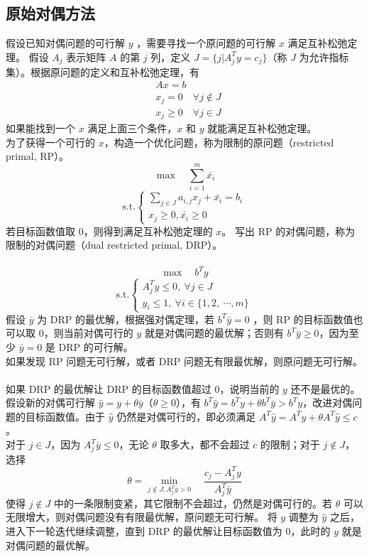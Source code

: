 \subsection{原始对偶方法}
假设已知对偶问题的可行解 $y$ ，需要寻找一个原问题的可行解 $x$ 满足互补松弛定理。
假设 $A_j$ 表示矩阵 $A$ 的第 $j$ 列，定义 $J = \{ j | A_j^Ty = c_j \}$（称 $J$ 为允许指标集）。根据原问题的定义和互补松弛定理，有
\begin{align}
& Ax = b \tag{1} \\ 
& x_j = 0 \quad \forall j \not\in J \tag{2} \\ 
& x_j \ge 0 \quad \forall j \in J \tag{3}
\end{align}
如果能找到一个 $x$ 满足上面三个条件，$x$ 和 $y$ 就能满足互补松弛定理。 \\
为了获得一个可行的 $x$，构造一个优化问题，称为限制的原问题（restricted primal, RP）。
$$
\max \quad \sum_{i = 1}^m \bar{x_i}
$$
$$
\text{s.t.} 
\begin{cases}
    \sum_{j \in J} a_{i, j}x_j + \bar{x_i} = b_i \\
    x_j \ge 0, \bar{x_i} \ge 0
\end{cases}
$$
若目标函数值取 $0$，则得到满足互补松弛定理的 $x$。
写出 RP 的对偶问题，称为限制的对偶问题（dual restricted primal, DRP）。 \\~\\ \pagebreak
$$
\max \quad b^Ty
$$
$$
\text{s.t.} 
\begin{cases}
    A^T_jy \le 0, \ \forall j \in J \\
    y_i \le 1, \ \forall i \in \{1, 2, \ \cdots, m\}
\end{cases}
$$
假设 $\bar{y}$ 为 DRP 的最优解，根据强对偶定理，若 $b^T\bar{y} = 0$ ，则 RP 的目标函数值也可以取 $0$，则当前对偶可行的 $y$ 就是对偶问题的最优解；否则有 $b^T\bar{y} \ge 0$，因为至少 $\bar{y} = 0$ 是 DRP 的可行解。 \\
如果发现 RP 问题无可行解，或者 DRP 问题无有限最优解，则原问题无可行解。 \\~\\
如果 DRP 的最优解让 DRP 的目标函数值超过 $0$，说明当前的 $y$ 还不是最优的。\\ 
假设新的对偶可行解 $\hat{y} = y + \theta\bar{y}$（$\theta \ge 0$），有 $b^T\hat{y} = b^Ty + \theta b^T\bar{y} > b^Ty$，改进对偶问题的目标函数值。由于 $\hat{y}$ 仍然是对偶可行的，即必须满足 $A^T\hat{y} = A^Ty + \theta A^T\hat{y} \le c$ 。 \\
对于 $j \in J$，因为 $A^T_j\bar{y} \le 0$，无论 $\theta$ 取多大，都不会超过 $c$ 的限制；对于 $j \not\in J$，选择
$$
\theta = \min_{j \not\in J, A^T_j\bar{y} > 0} \quad \frac{c_j - A^T_jy}{A^T_j\bar{y}}
$$
使得 $j \not\in J$ 中的一条限制变紧，其它限制不会超过，仍然是对偶可行的。若 $\theta$ 可以无限增大，则对偶问题没有有限最优解，原问题无可行解。
将 $y$ 调整为 $\hat{y}$ 之后，进入下一轮迭代继续调整，直到 DRP 的最优解让目标函数值为 $0$，此时的 $y$ 就是对偶问题的最优解。

